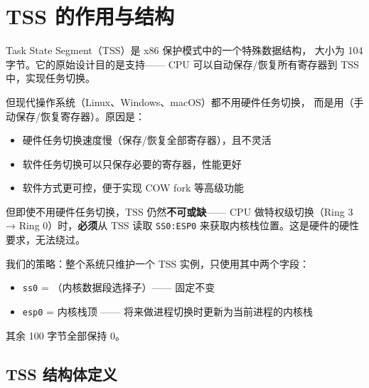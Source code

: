 \section{TSS 的作用与结构}
\label{sec:tss-struct}

Task State Segment（TSS）是 x86 保护模式中的一个特殊数据结构，
大小为 104 字节。它的原始设计目的是支持——
CPU 可以自动保存/恢复所有寄存器到 TSS 中，实现任务切换。

但现代操作系统（Linux、Windows、macOS）都不用硬件任务切换，
而是用（手动保存/恢复寄存器）。原因是：

\begin{itemize}
  \item 硬件任务切换速度慢（保存/恢复全部寄存器），且不灵活
  \item 软件任务切换可以只保存必要的寄存器，性能更好
  \item 软件方式更可控，便于实现 COW fork 等高级功能
\end{itemize}

但即使不用硬件任务切换，TSS 仍然\textbf{不可或缺}——
CPU 做特权级切换（Ring 3 → Ring 0）时，\textbf{必须}从 TSS 读取
\texttt{SS0:ESP0} 来获取内核栈位置。这是硬件的硬性要求，无法绕过。

\begin{designbox}
我们的策略：整个系统只维护一个 TSS 实例，只使用其中两个字段：
\begin{itemize}
  \item \texttt{ss0} = （内核数据段选择子）—— 固定不变
  \item \texttt{esp0} = 内核栈顶 —— 将来做进程切换时更新为当前进程的内核栈
\end{itemize}
其余 100 字节全部保持 0。
\end{designbox}

\subsection{TSS 结构体定义}

